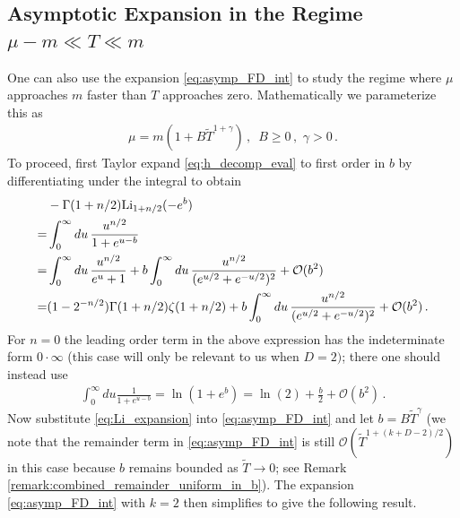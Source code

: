 \documentclass[sn-mathphys,Numbered]{sn-jnl}
\begin{document}
\subsection{Asymptotic Expansion in the Regime $\mu-m\ll T\ll m$}\label{sec:decaying_b}
One can also use the expansion \eqref{eq:asymp_FD_int} to study the regime where $\mu$ approaches $m$ faster than $T$ approaches zero. Mathematically we parameterize this as 
\begin{align}\label{eq:mu_decay_faster}
\mu=m(1+B\widetilde{T}^{1+\gamma})\,,\,\,\,  B\geq 0\,,\,\, \gamma>0\,.   
\end{align}
  To proceed, first  Taylor expand \eqref{eq:h_decomp_eval}  to first order in $b$ by differentiating under the integral to obtain
\begin{align}\label{eq:Li_expansion}
    &-\Gamma(1+n/2)\mathrm{Li}_{1+n/2}(-e^b)\\
    =&\int_0^\infty du \, \frac{u^{n/2}}{1+e^{u-b}}    \notag\\
    =&\int_0^\infty du\,\frac{u^{n/2}}{e^u+1}+b\int_0^\infty du\,\frac{u^{n/2}}{(e^{u/2}+e^{-u/2})^2}  +\mathcal{O}(b^2)\notag\\
    =&(1 - 2^{-n/2}) \Gamma(1 + n/2) \zeta(1 + n/2)+ b\int_0^\infty du\,\frac{u^{n/2}}{(e^{u/2}+e^{-u/2})^2} +\mathcal{O}(b^2)\,.\notag
\end{align}
For $n=0$ the leading order term in the above expression has the indeterminate form $0\cdot \infty$ (this case will only be  relevant to us when $D=2)$; there one should instead use
\begin{align}
\int_0^\infty du \frac{1}{1+e^{u-b}}=\ln(1+e^b)=    \ln(2)+\frac{b}{2}+\mathcal{O}(b^2)\,.
\end{align}
Now substitute \eqref{eq:Li_expansion} into \eqref{eq:asymp_FD_int} and let $b=B\widetilde{T}^\gamma$ (we note that the remainder term in \eqref{eq:asymp_FD_int} is still $\mathcal{O}(\widetilde{T}^{1+(k+D-2)/2})$ in this case because $b$ remains bounded as $\widetilde{T}\to 0$; see Remark \ref{remark:combined_remainder_uniform_in_b}). The expansion \eqref{eq:asymp_FD_int} with $k=2$ then simplifies to give the following result.
\end{document}
